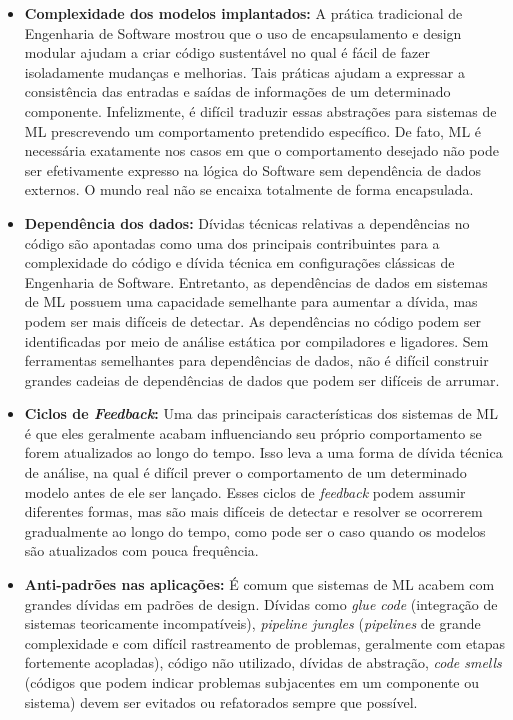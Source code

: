\documentclass[portugues]{ic-tese}
\begin{document}
\begin{itemize}
    \item \textbf{Complexidade dos modelos implantados:} A prática tradicional de Engenharia de Software mostrou que o uso de encapsulamento e design modular ajudam a criar código sustentável no qual é fácil de fazer isoladamente mudanças e melhorias. Tais práticas ajudam a expressar a consistência das entradas e saídas de informações de um determinado componente. Infelizmente, é difícil traduzir essas abstrações para sistemas de ML prescrevendo um comportamento pretendido específico. De fato, ML é necessária exatamente nos casos em que o comportamento desejado não pode ser efetivamente expresso na lógica do Software sem dependência de dados externos. O mundo real não se encaixa totalmente de forma encapsulada.
    \item \textbf{Dependência dos dados:} Dívidas técnicas relativas a dependências no código são apontadas como uma dos principais contribuintes para a complexidade do código e dívida técnica em configurações clássicas de Engenharia de Software. Entretanto, as dependências de dados em sistemas de ML possuem uma capacidade semelhante para aumentar a dívida, mas podem ser mais difíceis de detectar. As dependências no código podem ser identificadas por meio de análise estática por compiladores e ligadores. Sem ferramentas semelhantes para dependências de dados, não é difícil construir grandes cadeias de dependências de dados que podem ser difíceis de arrumar.
    \item \textbf{Ciclos de \textit{Feedback}:} Uma das principais características dos sistemas de ML é que eles geralmente acabam influenciando seu próprio comportamento se forem atualizados ao longo do tempo. Isso leva a uma forma de dívida técnica de análise, na qual é difícil prever o comportamento de um determinado modelo antes de ele ser lançado. Esses ciclos de \textit{feedback} podem assumir diferentes formas, mas são mais difíceis de detectar e resolver se ocorrerem gradualmente ao longo do tempo, como pode ser o caso quando os modelos são atualizados com pouca frequência.
    \item \textbf{Anti-padrões nas aplicações:} É comum que sistemas de ML acabem com grandes dívidas em padrões de design. Dívidas como \textit{glue code} (integração de sistemas teoricamente incompatíveis), \textit{pipeline jungles} (\textit{pipelines} de grande complexidade e com difícil rastreamento de problemas, geralmente com etapas fortemente acopladas), código não utilizado, dívidas de abstração, \textit{code smells} (códigos que podem indicar problemas subjacentes em um componente ou sistema) devem ser evitados ou refatorados sempre que possível.

\end{itemize}
\end{document}
